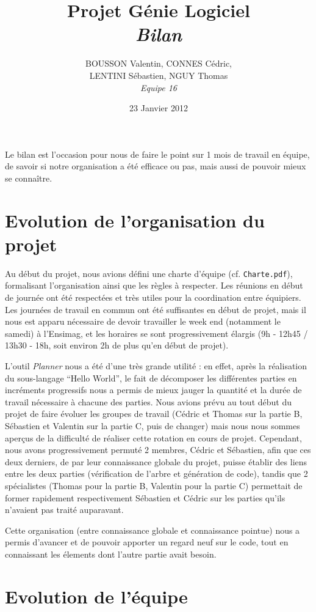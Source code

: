 \documentclass[11pt]{article}
\title{Projet Génie Logiciel\\\emph{Bilan}}
\author{BOUSSON Valentin, CONNES Cédric,\\LENTINI Sébastien, NGUY Thomas\\\emph{Equipe 16}}
\date{23 Janvier 2012}
\begin{document}
\maketitle

Le bilan est l'occasion pour nous de faire le point sur 1 mois de travail en équipe, de savoir si notre organisation a été efficace ou pas, mais aussi de pouvoir mieux se connaître.

\section{Evolution de l'organisation du projet}
Au début du projet, nous avions défini une charte d'équipe (cf. \verb!Charte.pdf!), formalisant l'organisation ainsi que les règles à respecter. Les réunions en début de journée ont été respectées et très utiles pour la coordination entre équipiers. Les journées de travail en commun ont été suffisantes en début de projet, mais il nous est apparu nécessaire de devoir travailler le week end (notamment le samedi) à l'Ensimag, et les horaires se sont progressivement élargis (9h - 12h45 / 13h30 - 18h, soit environ 2h de plus qu'en début de projet).

L'outil \emph{Planner} nous a été d'une très grande utilité : en effet, après la réalisation du sous-langage ``Hello World'', le fait de décomposer les différentes parties en incréments progressifs nous a permis de mieux jauger la quantité et la durée de travail nécessaire à chacune des parties. Nous avions prévu au tout début du projet de faire évoluer les groupes de travail (Cédric et Thomas sur la partie B, Sébastien et Valentin sur la partie C, puis de changer) mais nous nous sommes aperçus de la difficulté de réaliser cette rotation en cours de projet. Cependant, nous avons progressivement permuté 2 membres, Cédric et Sébastien, afin que ces deux derniers, de par leur connaissance globale du projet, puisse établir des liens entre les deux parties (vérification de l'arbre et génération de code), tandis que 2 spécialistes (Thomas pour la partie B, Valentin pour la partie C) permettait de former rapidement respectivement Sébastien et Cédric sur les parties qu'ils n'avaient pas traité auparavant.

Cette organisation (entre connaissance globale et connaissance pointue) nous a permis d'avancer et de pouvoir apporter un regard neuf sur le code, tout en connaissant les élements dont l'autre partie avait besoin. 


\section{Evolution de l'équipe}
\end{document}
